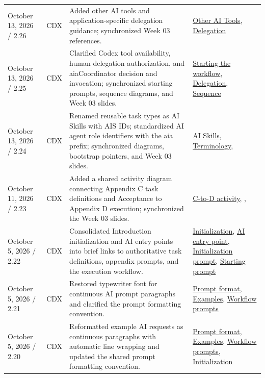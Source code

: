 \begin{tabularx}{\linewidth}{L{3.1cm}L{2.2cm}YL{2.0cm}}
October 13, 2026 / 2.26 & CDX & Added other AI tools and application-specific delegation guidance; synchronized Week 03 references. & \hyperref[Section:AIOtherTools]{Other AI Tools}, \hyperref[Section:AIAgentDelegation]{Delegation}\\
October 13, 2026 / 2.25 & CDX & Clarified Codex tool availability, human delegation authorization, and aiaCoordinator decision and invocation; synchronized starting prompts, sequence diagrams, and Week 03 slides. & \hyperref[Section:AIImplementationStart]{Starting the workflow}, \hyperref[Section:AIAgentDelegation]{Delegation}, \hyperref[Figure:AIImplementationSequence]{Sequence}\\
October 13, 2026 / 2.24 & CDX & Renamed reusable task types as AI Skills with AIS IDs; standardized AI agent role identifiers with the aia prefix; synchronized diagrams, bootstrap pointers, and Week 03 slides. & \hyperref[Table:AISkills]{AI Skills}, \hyperref[Rule:AITerminologyConsistency]{Terminology}, \\
October 11, 2026 / 2.23 & CDX & Added a shared activity diagram connecting Appendix C task definitions and Acceptance to Appendix D execution; synchronized the Week 03 slides. & \hyperref[Figure:AITaskExecutionActivity]{C-to-D activity}, , \\
October 5, 2026 / 2.22 & CDX & Consolidated Introduction initialization and AI entry points into brief links to authoritative task definitions, appendix prompts, and the execution workflow. & \hyperref[Section:InitializeNewProject]{Initialization}, \hyperref[Section:UsingTemplateAI]{AI entry point}, \hyperref[Section:AIInitializePrompt]{Initialization prompt}, \hyperref[Section:AIStartSelectedTaskPrompt]{Starting prompt}\\
October 5, 2026 / 2.21 & CDX & Restored typewriter font for continuous AI prompt paragraphs and clarified the prompt formatting convention. & \hyperref[Section:AIPromptFormatting]{Prompt format}, \hyperref[Section:AIExamplePrompts]{Examples}, \hyperref[Section:AIImplementationStart]{Workflow prompts}\\
October 5, 2026 / 2.20 & CDX & Reformatted example AI requests as continuous paragraphs with automatic line wrapping and updated the shared prompt formatting convention. & \hyperref[Section:AIPromptFormatting]{Prompt format}, \hyperref[Section:AIExamplePrompts]{Examples}, \hyperref[Section:AIImplementationStart]{Workflow prompts}, \hyperref[Section:InitializeNewProject]{Initialization}\\

\end{tabularx}
